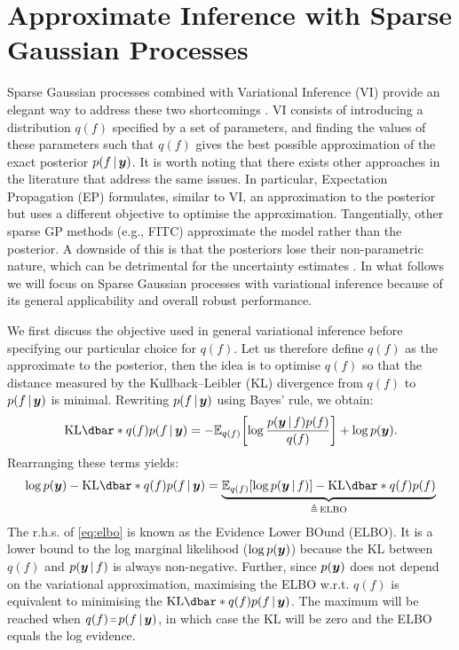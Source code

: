 \section{Approximate Inference with Sparse Gaussian Processes}
\label{sec:svgp}

Sparse Gaussian processes combined with Variational Inference (VI) provide an elegant way to address these two shortcomings \citep{titsias2009, hensman2013, hensman2015scalable}. VI consists of introducing a distribution $q(f)$ specified by a set of parameters, and finding the values of these parameters such that $q(f)$ gives the best possible approximation of the exact posterior $p(f \,|\, \bm{y} )$. It is worth noting that there exists other approaches in the literature that address the same issues. In particular, Expectation Propagation (EP) \citep{minka2001expectation,bui2017unifying} formulates, similar to VI, an approximation to the posterior but uses a different objective to optimise the approximation. Tangentially, other sparse GP methods (e.g., FITC) \citep{Snelson05,quinonero2005unifying} approximate the model rather than the posterior. A downside of this is that the posteriors lose their non-parametric nature, which can be detrimental for the uncertainty estimates \citep{bauer2016understanding}. In what follows we will focus on Sparse Gaussian processes with variational inference because of its general applicability and overall robust performance.

We first discuss the objective used in general variational inference before specifying our particular choice for $q(f)$. Let us therefore define $q(f)$ as the approximate to the posterior, then the idea is to optimise $q(f)$ so that the distance measured by the Kullback–Leibler (KL) divergence from $q(f)$ to $p(f \,|\, \bm{y})$ is minimal. Rewriting $p(f \,|\, \bm{y})$ using Bayes' rule, we obtain:
\begin{equation}
  \KL{q(f)}{p(f \given \vy)} = -{\Exp{q(f)}{\log \frac{p(\vy \given f) p(f)}{q(f)}}} + \log p(\vy).
\end{equation}
Rearranging these terms yields:
\begin{equation}
  \label{eq:elbo}
  \log p(\vy) - \KL{q(f)}{p(f \given \vy)} = 
  \underbrace{\Exp{q(f)}{\log p(\vy \given f)} - \KL{q(f)}{p(f)}}_{\triangleq\,\textrm{ELBO}}
\end{equation}
The r.h.s. of \cref{eq:elbo} is known as the Evidence Lower BOund (ELBO). It is a lower bound to the log marginal likelihood ($\log p(\bm{y})$) because the KL between $q(f)$ and $p(\bm{y} \,|\, f)$ is always non-negative. Further, since $p(\bm{y})$ does not depend on the variational approximation, maximising the ELBO w.r.t. $q(f)$ is equivalent to minimising the $\KL{q(f)}{p(f \given \vy)}$. The maximum will be reached when $q(f) \shorteq p(f \given \vy)$, in which case the KL will be zero and the ELBO equals the log evidence. 

